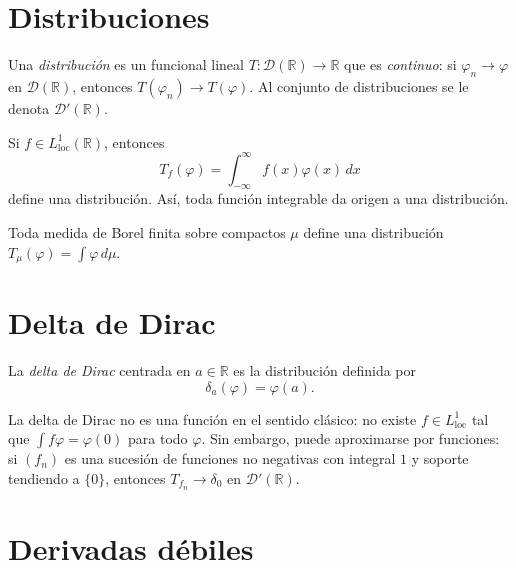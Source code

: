 \section{Distribuciones}

\begin{definition}
\label{def:distribucion}
Una \emph{distribución} es un funcional lineal $T\colon\mathcal{D}(\mathbb{R})\to\mathbb{R}$ que es \emph{continuo}: si $\varphi_n\to\varphi$ en $\mathcal{D}(\mathbb{R})$, entonces $T(\varphi_n)\to T(\varphi)$. Al conjunto de distribuciones se le denota $\mathcal{D}'(\mathbb{R})$.
\end{definition}

\begin{example}
\label{ej:distribucion-l1}
Si $f\in L^1_{\mathrm{loc}}(\mathbb{R})$, entonces
\[
  T_f(\varphi)=\int_{-\infty}^{\infty}f(x)\varphi(x)\,dx
\]
define una distribución. Así, toda función integrable da origen a una distribución.
\end{example}

\begin{example}
\label{ej:distribucion-medida}
Toda medida de Borel finita sobre compactos $\mu$ define una distribución $T_\mu(\varphi)=\int\varphi\,d\mu$.
\end{example}

\section{Delta de Dirac}

\begin{definition}
\label{def:delta-dirac}
La \emph{delta de Dirac} centrada en $a\in\mathbb{R}$ es la distribución definida por
\[
  \delta_a(\varphi)=\varphi(a).
\]
\end{definition}

\begin{remark}
La delta de Dirac no es una función en el sentido clásico: no existe $f\in L^1_{\mathrm{loc}}$ tal que $\int f\varphi=\varphi(0)$ para todo $\varphi$. Sin embargo, puede aproximarse por funciones: si $(f_n)$ es una sucesión de funciones no negativas con integral $1$ y soporte tendiendo a $\{0\}$, entonces $T_{f_n}\to\delta_0$ en $\mathcal{D}'(\mathbb{R})$.
\end{remark}

\section{Derivadas débiles}

